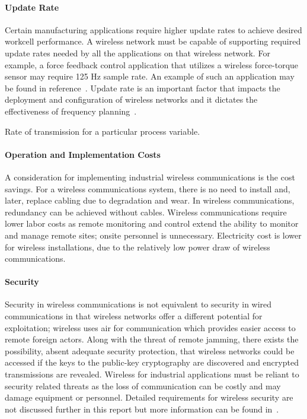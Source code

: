 {\paragraph{Update Rate}
Certain manufacturing applications require higher update rates to achieve desired workcell performance. A wireless network must be capable of supporting required update rates needed by all the applications on that wireless network. For example, a force feedback control application that utilizes a wireless force-torque sensor may require 125 Hz sample rate. An example of such an application may be found in reference~\cite{Candell_ISIT_2019}. Update rate is an important factor that impacts the deployment and configuration of wireless networks and it dictates the effectiveness of frequency planning~\cite{Candell2018.IWSGuide}.
\begin{definition} \label{def:updaterate}
	Rate of transmission for a particular process variable.
\end{definition}

\paragraph{Operation and Implementation Costs}
A consideration for implementing industrial wireless communications is the cost savings. For a wireless communications system, there is no need to install and, later, replace cabling due to degradation and wear. In wireless communications, redundancy can be achieved without cables. Wireless communications require lower labor costs as remote monitoring and control extend the ability to monitor and manage remote sites; onsite personnel is unnecessary. Electricity cost is lower for wireless installations, due to the relatively low power draw of wireless communications.

\paragraph{Security}
Security in wireless communications is not equivalent to security in wired communications in that wireless networks offer a different potential for exploitation; wireless uses air for communication which provides easier access to remote foreign actors. Along with the threat of remote jamming, there exists the possibility, absent adequate security protection, that wireless networks could be accessed if the keys to the public-key cryptography are discovered and encrypted transmissions are revealed. Wireless for industrial applications must be reliant to security related threats as the loss of communication can be costly and may damage equipment or personnel. Detailed requirements for wireless security are not discussed further in this report but more information can be found in~\cite{Stouffer2015}.

}

